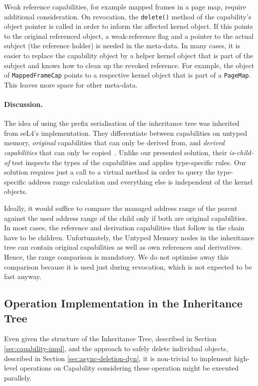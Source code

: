 Weak reference capabilities, for example mapped frames in a page map, require additional consideration. On revocation, the \texttt{delete()} method of the capability's object pointer is called in order to inform the affected kernel object. If this points to the original referenced object, a weak-reference flag and a pointer to the actual subject (the reference holder) is needed in the meta-data. In many cases, it is easier to replace the capability object by a helper kernel object that is part of the subject and knows how to clean up the revoked reference. For example, the object of \texttt{MappedFrameCap} points to a respective kernel object that is part of a \texttt{PageMap}. This leaves more space for other meta-data.

\paragraph{Discussion.}
The idea of using the prefix serialisation of the inheritance tree was inherited from seL4's implementation. They differentiate between capabilities on untyped memory, \emph{original} capabilities that can only be derived from, and \emph{derived capabilities} that can only be copied~\cite{GrosvenorWalker2016}.
Unlike our presented solution, their \emph{is-child-of} test inspects the types of the capabilities and applies type-specific rules. Our solution requires just a call to a virtual method in order to query the type-specific address range calculation and everything else is independent of the kernel objects.

Ideally, it would suffice to compare the managed address range of the parent against the used address range of the child only if both are original capabilities. In most cases, the reference and derivation capabilities that follow in the chain have to be children. Unfortunately, the Untyped Memory nodes in the inheritance tree can contain original capabilities as well as own references and derivatives. Hence, the range comparison is mandatory. We do not optimise away this comparison because it is used just during revocation, which is not expected to be fast anyway.

\subsection{Operation Implementation in the Inheritance Tree}
\label{sec:capability-ops} 

Even given the structure of the Inheritance Tree, described in Section \ref{sec:capability-impl}, and the approach to safely delete individual objects, described in Section \ref{sec:async-deletion-dyn}, it is non-trivial to implement high-level operations on Capability considering these operation might be executed parallely.

